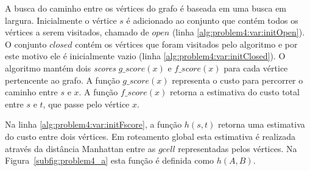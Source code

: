 
A busca do caminho entre os vértices do grafo é baseada em uma busca em largura.
Inicialmente o vértice $s$ é adicionado ao conjunto que contém todos os vértices a serem visitados, chamado de $open$ (linha \ref{alg:problem4:var:initOpen}).
O conjunto $closed$ contém os vértices que foram visitados pelo algoritmo e por este motivo ele é inicialmente vazio (linha \ref{alg:problem4:var:initClosed}).
O algoritmo mantém dois \textit{scores} $g\_score(x)$ e $f\_score(x)$ para cada vértice pertencente ao grafo. 
A função $g\_score(x)$ representa o custo para percorrer o caminho entre $s$ e $x$.
A função $f\_score(x)$ retorna a estimativa do custo total entre $s$ e $t$, que passe pelo vértice $x$.


Na linha \ref{alg:problem4:var:initFscore}, a função $h(s, t)$ retorna uma estimativa do custo entre dois vértices.
Em roteamento global esta estimativa é realizada através da distância Manhattan entre as $gcell$ representadas pelos vértices.
Na Figura~\ref{subfig:problem4_a} esta função é definida como $h(A, B)$.

